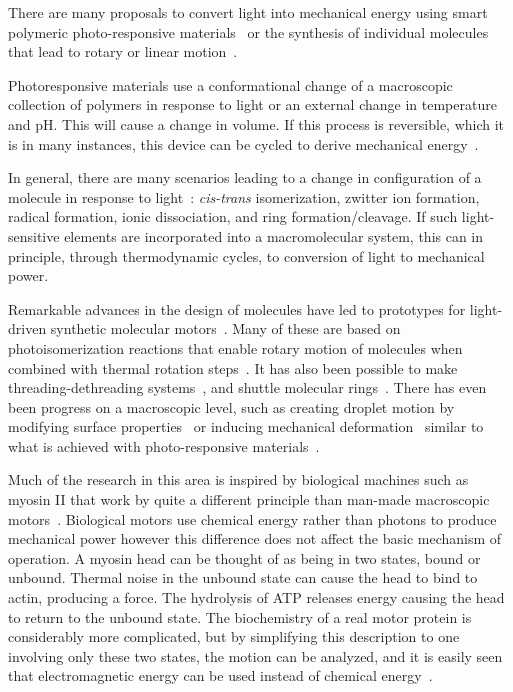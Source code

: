 \documentclass[11pt]{ucthesis}
\begin{document}
There are many proposals to convert light into mechanical energy using smart
polymeric photo-responsive materials~\cite{IrieKunwatchakun,Irie,SuzukiHirasa,BehlLendlein,RoyGupta}
or the synthesis of individual molecules that lead to rotary or linear motion~\cite{credi2006}.  

Photoresponsive materials
use a conformational change of a macroscopic collection of polymers in response
to light or an external change in temperature and pH. This will cause a change
in volume. If this process is reversible, which it is in many instances, this
device can be cycled to derive mechanical energy~\cite{IrieKunwatchakun,Irie,SuzukiHirasa}. 

In general, there are many scenarios leading to a change in configuration of a molecule in
response to light~\cite{Irie}: {\em cis-trans} isomerization, zwitter ion formation, radical
formation, ionic dissociation, and ring formation/cleavage. If such
light-sensitive elements are incorporated into a macromolecular system, this can
in principle, through thermodynamic cycles, to conversion of light to
mechanical power.

Remarkable advances in the design of molecules have led to prototypes for
light-driven synthetic molecular motors~\cite{credi2006}. Many of these are
based on photoisomerization reactions that enable rotary motion of molecules
when combined with thermal rotation steps~\cite{terWiel2005,Ruangsupapichat,Vicario,credi2006}. 
It has also been possible to make threading-dethreading systems~\cite{Ashton1998,credi2006},
and shuttle molecular rings~\cite{Ashton2000,credi2006}. There has even been
progress on a macroscopic level, such as creating droplet motion by modifying surface
properties~\cite{Berna} or inducing mechanical deformation~\cite{Liu} similar to
what is achieved with photo-responsive materials~\cite{IrieKunwatchakun,Irie,SuzukiHirasa,BehlLendlein,RoyGupta}.

Much of the research in this area is inspired by biological machines such as myosin II that work by
quite a different principle than man-made macroscopic motors~\cite{BustamanteKellerOster}. Biological
motors use chemical energy rather than photons to produce mechanical power however this
difference does not affect the basic mechanism of operation. A myosin
head can be thought of as being in two states, bound or unbound. Thermal noise in the unbound state can cause
the head to bind to actin, producing a force. The hydrolysis of ATP releases energy
causing the head to return to the unbound state.  
The biochemistry of a real motor protein is considerably more complicated, but
by simplifying this description to one involving only these two states,
the motion can be analyzed, and 
it is easily seen that electromagnetic energy can be used instead of chemical
energy~\cite{ProstPRL}. 
\end{document}
